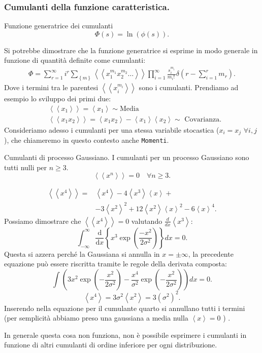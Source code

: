 \subsubsection{Cumulanti della funzione caratteristica.}%
\label{sub:Sviluppo in cumulanti di phi}
\begin{redbox}{Funzione generatrice dei cumulanti}
   \[
       \Phi(s) = \ln (\phi (s) ) 
   .\]  
\end{redbox}
\noindent
Si potrebbe dimostrare che la funzione generatrice si esprime in modo generale in funzione di quantità definite come cumulanti:
\[\begin{aligned}
    \Phi = \sum_{r=1}^{\infty} i^r \sum_{\left\{m\right\}}^{} 
    \left<\left< x_1^{m_1}x_2^{m_2}\ldots\right>\right> 
    \prod_{i=1}^{\infty} \frac{s_i^{m_i}}{m_i!\,}\delta (r-\sum_{i=1}^{r} m_r) 
.\end{aligned}\]
Dove i termini tra le parentesi $\left<\left< x_i^{m_i}\right>\right>$ sono i cumulanti. Prendiamo ad esempio lo sviluppo dei primi due:
\[\begin{aligned}
    & \left<\left<x_1\right>\right> = \left<x_1\right> \sim \text{Media}\\
    & \left<\left<x_1 x_2 \right>\right> = \left<x_1x_2\right> - \left<x_1\right>\left<x_2\right> \sim \text{ Covarianza}
.\end{aligned}\]
Consideriamo adesso i cumulanti per una stessa variabile stocastica ($x_i = x_j $ $\forall i, j$), che chiameremo in questo contesto anche \texttt{Momenti}.
\begin{greenbox}{Cumulanti di processo Gaussiano.}
   I cumulanti per un processo Gaussiano sono tutti nulli per $n\ge 3$.
   \[
       \left<\left<x^n\right>\right> = 0 \quad \forall n \ge  3
   .\] 
\end{greenbox}
\begin{exmp}
    \[\begin{aligned}
	\left<\left<x^4\right>\right> =& \left<x^4\right>-4\left<x^3\right>\left<x\right>+\\
					&-3\left<x^2\right>^2 + 12\left<x^2\right>\left<x\right>^2-6\left<x\right>^4
    .\end{aligned}\]
    Possiamo dimostrare che $\left<\left<x^4\right>\right> = 0$ valutando $\frac{d}{dx}\left<x^3\right>$:
    \[
        \int_{-\infty}^{\infty} \frac{\text{d} }{\text{d} x} \left\{x^3 \exp\left(\frac{-x^2}{2\sigma^2}\right)\right\} dx = 0 
    .\] 
    Questa si azzera perché la Gaussiana si annulla in $x = \pm \infty$, la precedente equazione può essere riscritta tramite le regole della derivata composta:
    \[
        \int\left(3x^2\exp\left(-\frac{x^2}{2\sigma^2}\right) - 
		\frac{x^4}{\sigma^2}\exp\left(- \frac{x^2}{2\sigma^2}\right) \right)dx = 0 
    .\] 
    \[
	\left<x^4\right> = 3\sigma^2\left<x^2\right> = 3 \left(\sigma^2\right)^2
    .\] 
    Inserendo nella equazione per il cumulante quarto si annullano tutti i termini (per semplicità abbiamo preso una gaussiana a media nulla $\left<x\right>=0$ ) .
\end{exmp}
\noindent
In generale questa cosa non funziona, non è possibile esprimere i cumulanti in funzione di altri cumulanti di ordine inferiore per ogni distribuzione.


